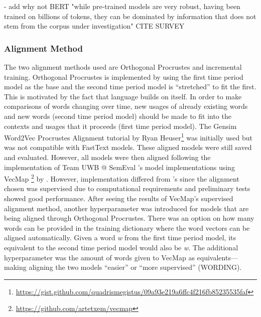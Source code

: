 - add why not BERT "while pre-trained models are very robust, having been trained on billions of tokens, they can be dominated by information that does not stem from the corpus under investigation" CITE SURVEY

\subsubsection{Alignment Method}

The two alignment methods used are Orthogonal Procrustes and incremental training. Orthogonal Procrustes is implemented by using the first time period model as the base and the second time period model is “stretched” to fit the first. This is motivated by the fact that language builds on itself. In order to make comparisons of words changing over time, new usages of already existing words and new words (second time period model) should be made to fit into the contexts and usages that it proceeds (first time period model). The Gensim Word2Vec Procrustes Alignment tutorial by Ryan Heuser\footnote{\url{https://gist.github.com/quadrismegistus/09a93e219a6ffc4f216fb85235535faf}}  was initially used but was not compatible with FastText models. These aligned models were still saved and evaluated. However, all models were then aligned following the implementation of Team UWB @ SemEval \citet{prazak-etal-2020-uwb}’s model implementations using VecMap \footnote{\url{https://github.com/artetxem/vecmap}} by \citet{artetxe2018generalizing}. However, implementation differed from \citet{prazak-etal-2020-uwb}’s since the alignment chosen was supervised due to computational requirements and preliminary tests showed good performance. After seeing the results of VecMap’s supervised alignment method, another hyperparameter was introduced for models that are being aligned through Orthogonal Procrustes. There was an option on how many words can be provided in the training dictionary where the word vectors can be aligned automatically. Given a word \emph{w} from the first time period model, its equivalent to the second time period model would also be \emph{w}. The additional hyperparameter was the amount of words given to VecMap as equivalents—making aligning the two models “easier” or “more supervised” (WORDING).

